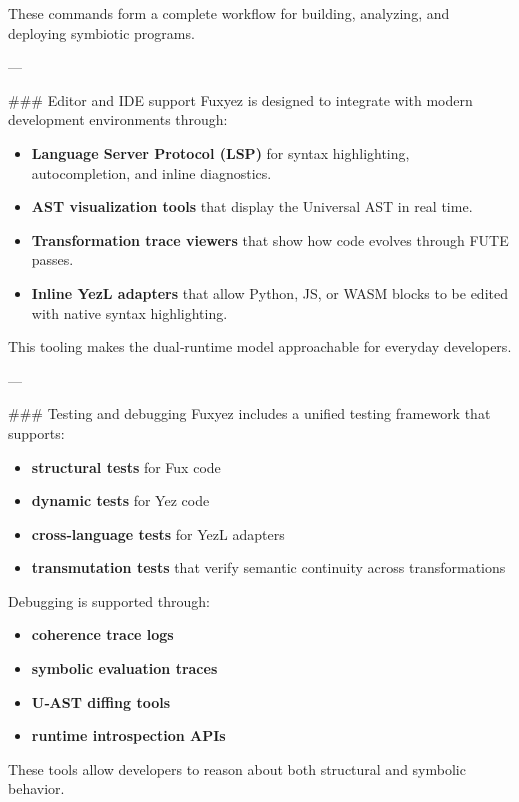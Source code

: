 \documentclass[12pt, a4paper]{book}
\begin{document}
These commands form a complete workflow for building, analyzing, and deploying symbiotic programs.

---

\#\#\# Editor and IDE support  
Fuxyez is designed to integrate with modern development environments through:

\begin{itemize}
  \item \textbf{Language Server Protocol (LSP)} for syntax highlighting, autocompletion, and inline diagnostics.  
  \item \textbf{AST visualization tools} that display the Universal AST in real time.  
  \item \textbf{Transformation trace viewers} that show how code evolves through FUTE passes.  
  \item \textbf{Inline YezL adapters} that allow Python, JS, or WASM blocks to be edited with native syntax highlighting.
\end{itemize}

This tooling makes the dual‑runtime model approachable for everyday developers.

---

\#\#\# Testing and debugging  
Fuxyez includes a unified testing framework that supports:

\begin{itemize}
  \item \textbf{structural tests} for Fux code  
  \item \textbf{dynamic tests} for Yez code  
  \item \textbf{cross‑language tests} for YezL adapters  
  \item \textbf{transmutation tests} that verify semantic continuity across transformations  
\end{itemize}

Debugging is supported through:

\begin{itemize}
  \item \textbf{coherence trace logs}  
  \item \textbf{symbolic evaluation traces}  
  \item \textbf{U‑AST diffing tools}  
  \item \textbf{runtime introspection APIs}  
\end{itemize}

These tools allow developers to reason about both structural and symbolic behavior.
\end{document}
